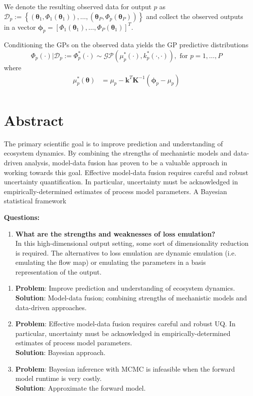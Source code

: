 \documentclass[12pt]{article}
\newcommand{\btheta}{\boldsymbol{\theta}}
\begin{document}
We denote the resulting observed data for output $p$ as 
$\mathcal{D}_p := \left\{(\btheta_1, \Phi_1(\btheta_1)), \dots, (\btheta_P, \Phi_p(\btheta_P))  \right\}$ and collect the observed outputs in a vector 
$\boldsymbol{\phi}_p = \left[\Phi_1(\btheta_1), \dots, \Phi_P(\btheta_1) \right]^T$.

Conditioning the GPs on the observed data yields the GP predictive distributions 
\[\Phi_p(\cdot)|\mathcal{D}_p := \Phi_p^*(\cdot) \sim \mathcal{GP}(\mu^*_p(\cdot), k_p^*(\cdot, \cdot)), \text{ for } p = 1, \dots, P\]
where 
\begin{align*}
\mu_p^*(\btheta) &= \mu_p  - \mathbf{k}^T \mathbf{K}^{-1} \left(\boldsymbol{\phi}_p - \mu_p \right) \\
\end{align*}

\section{Abstract}
The primary scientific goal is to improve prediction and understanding of ecosystem dynamics. By combining the strengths of mechanistic models and data-driven analysis, model-data fusion 
has proven to be a valuable approach in working towards this goal. Effective model-data fusion requires careful and robust uncertainty quantification. In particular, uncertainty must be acknowledged 
in empirically-determined estimates of process model parameters. A Bayesian statistical framework  

\bigskip
\textbf{Questions:} 
\begin{enumerate}
\item \textbf{What are the strengths and weaknesses of loss emulation?} \\ 
In this high-dimensional output setting, some sort of dimensionality reduction is required. The alternatives to loss emulation are dynamic emulation (i.e. emulating the flow map) or 
emulating the parameters in a basis representation of the output. 
\end{enumerate}

\begin{enumerate}
\item \textbf{Problem}: Improve prediction and understanding of ecosystem dynamics. \\
	\textbf{Solution}: Model-data fusion; combining strengths of mechanistic models and data-driven approaches. 
\item \textbf{Problem}: Effective model-data fusion requires careful and robust UQ. In particular, uncertainty must be acknowledged in empirically-determined estimates of process model parameters. \\
\textbf{Solution}: Bayesian approach. 
\item \textbf{Problem}: Bayesian inference with MCMC is infeasible when the forward model runtime is very costly. \\
\textbf{Solution}: Approximate the forward model. 
\end{enumerate}
\end{document}
